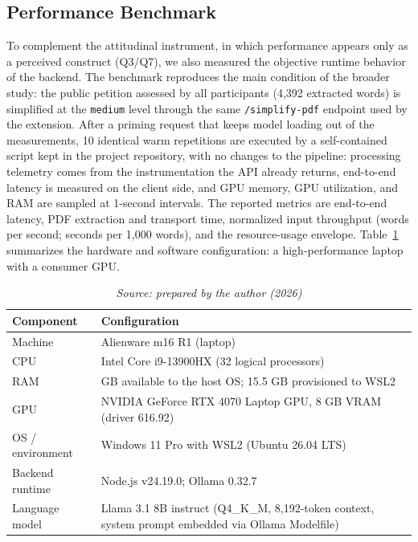 \documentclass[english]{UNISINOSartigo} %
\newcommand{\floatsource}[1]{\caption*{\footnotesize\textit{Source: #1}}}
\newcommand{\tablesource}[1]{\floatsource{#1}}
\begin{document}
\subsection{Performance Benchmark}

To complement the attitudinal instrument, in which performance appears only as a perceived construct (Q3/Q7), we also measured the objective runtime behavior of the backend. The benchmark reproduces the main condition of the broader study: the public petition assessed by all participants (4,392 extracted words) is simplified at the \texttt{medium} level through the same \texttt{/simplify-pdf} endpoint used by the extension. After a priming request that keeps model loading out of the measurements, 10 identical warm repetitions are executed by a self-contained script kept in the project repository, with no changes to the pipeline: processing telemetry comes from the instrumentation the API already returns, end-to-end latency is measured on the client side, and GPU memory, GPU utilization, and RAM are sampled at 1-second intervals. The reported metrics are end-to-end latency, PDF extraction and transport time, normalized input throughput (words per second; seconds per 1,000 words), and the resource-usage envelope. Table~\ref{tab:bench-hw} summarizes the hardware and software configuration: a high-performance laptop with a consumer GPU.

\begin{table}[H]\centering
\caption{Hardware and software configuration used in the performance benchmark.}
\label{tab:bench-hw}
\footnotesize
\setlength{\tabcolsep}{4pt}
\renewcommand{\arraystretch}{1.0}
\begin{tabularx}{\textwidth}{@{}l >{\raggedright\arraybackslash}X@{}}
\toprule
\textbf{Component} & \textbf{Configuration} \\
\midrule
Machine & Alienware m16 R1 (laptop) \\
CPU & Intel Core i9-13900HX (32 logical processors) \\
RAM & 31 GB available to the host OS; 15.5 GB provisioned to WSL2 \\
GPU & NVIDIA GeForce RTX 4070 Laptop GPU, 8 GB VRAM (driver 616.92) \\
OS / environment & Windows 11 Pro with WSL2 (Ubuntu 26.04 LTS) \\
Backend runtime & Node.js v24.19.0; Ollama 0.32.7 \\
Language model & Llama 3.1 8B instruct (Q4\_K\_M, 8,192-token context, system prompt embedded via Ollama Modelfile) \\
\bottomrule
\end{tabularx}
\tablesource{prepared by the author (2026)}
\end{table}
\end{document}
